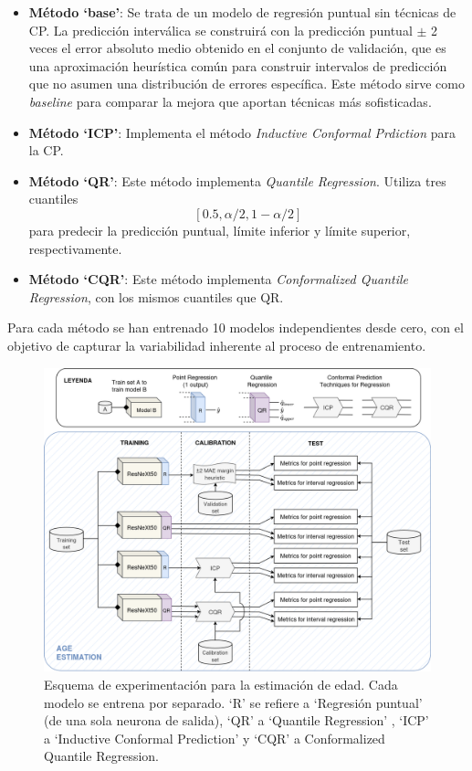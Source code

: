 \begin{itemize}

    \item \textbf{Método `base'}: Se trata de un modelo de regresión puntual sin técnicas de \acrshort{CP}. La predicción interválica se construirá con la predicción puntual $\pm$ 2 veces el error absoluto medio obtenido en el conjunto de validación, que es una aproximación heurística común para construir intervalos de predicción que no asumen una distribución de errores específica. Este método sirve como \textit{baseline} para comparar la mejora que aportan técnicas más sofisticadas.

    \item \textbf{Método `ICP'}: Implementa el método \textit{Inductive Conformal Prdiction} para la \acrshort{CP}. 
    
    \item \textbf{Método `QR'}: Este método implementa \textit{Quantile Regression}. Utiliza tres cuantiles 
    $$
    [0.5, \alpha/2, 1-\alpha/2]
    $$ 
    para predecir la predicción puntual, límite inferior y límite superior, respectivamente.

    \item \textbf{Método `CQR'}: Este método implementa \textit{Conformalized Quantile Regression}, con los mismos cuantiles que \acrshort{QR}. 

\end{itemize} 

Para cada método se han entrenado 10 modelos independientes desde cero, con el objetivo de capturar la variabilidad inherente al proceso de entrenamiento.

\begin{figure}[htbp]
    \centering
    \includegraphics[angle=90, width=\textwidth]{capitulos/cap_05/imagenes/AE_experimental_pipeline.png}
    \caption[
        Esquema de experimentación para la estimación de edad.
    ]{
        Esquema de experimentación para la estimación de edad. Cada modelo se entrena por separado. `R' se refiere a `Regresión puntual' (de una sola neurona de salida), `QR' a `Quantile Regression' , `ICP' a `Inductive Conformal Prediction' y `CQR' a Conformalized Quantile Regression.
    } 
    \label{fig:AE_experimental_pipeline}
\end{figure}

